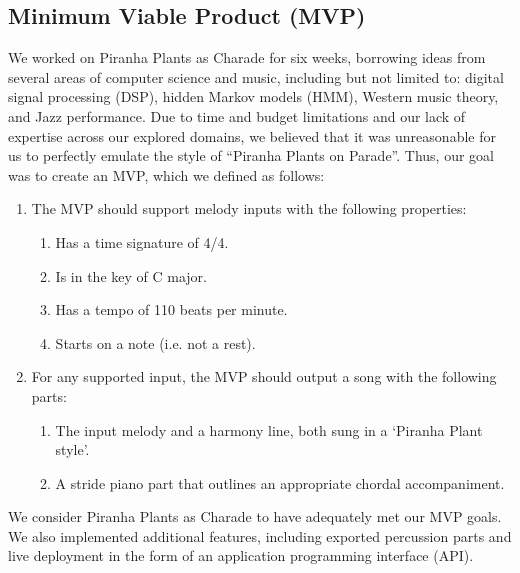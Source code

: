 \subsection{Minimum Viable Product (MVP)}

We worked on Piranha Plants as Charade for six weeks, borrowing ideas from several areas of computer science and music, including but not limited to: digital signal processing (DSP), hidden Markov models (HMM), Western music theory, and Jazz performance. Due to time and budget limitations and our lack of expertise across our explored domains, we believed that it was unreasonable for us to perfectly emulate the style of ``Piranha Plants on Parade''. Thus, our goal was to create an MVP, which we defined as follows:
\begin{enumerate}
    \item The MVP should support melody inputs with the following properties:
    \begin{enumerate}
        \item Has a time signature of 4/4.
        \item Is in the key of C major.
        \item Has a tempo of 110 beats per minute.
        \item Starts on a note (i.e. not a rest).
    \end{enumerate}
    \item For any supported input, the MVP should output a song with the following parts:
    \begin{enumerate}
        \item The input melody and a harmony line, both sung in a `Piranha Plant style'.
        \item A stride piano part that outlines an appropriate chordal accompaniment.
    \end{enumerate}
\end{enumerate}

We consider Piranha Plants as Charade to have adequately met our MVP goals. We also implemented additional features, including exported percussion parts and live deployment in the form of an application programming interface (API).
